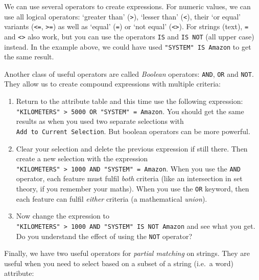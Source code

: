 \documentclass[
  letterpaper,
  DIV=11,
  numbers=noendperiod]{scrreprt}
\begin{document}
We can use several operators to create expressions. For numeric values,
we can use all logical operators: `greater than'
(\texttt{\textgreater{}}), `lesser than' (\texttt{\textless{}}), their
`or equal' variants (\texttt{\textless{}=}, \texttt{\textgreater{}=}) as
well as `equal' (\texttt{=}) or `not equal'
(\texttt{\textless{}\textgreater{}}). For strings (text), \texttt{=} and
\texttt{\textless{}\textgreater{}} also work, but you can use the
operators \texttt{IS} and \texttt{IS\ NOT} (all upper case) instead. In
the example above, we could have used
\texttt{"SYSTEM"\ IS\ \textquotesingle{}Amazon\textquotesingle{}} to get
the same result.

Another class of useful operators are called \emph{Boolean} operators:
\texttt{AND}, \texttt{OR} and \texttt{NOT}. They allow us to create
compound expressions with multiple criteria:

\begin{enumerate}
\def\labelenumi{(\arabic{enumi})}
\setcounter{enumi}{88}
\item
  Return to the attribute table and this time use the following
  expression:
  \texttt{"KILOMETERS"\ \textgreater{}\ 5000\ OR\ "SYSTEM"\ =\ \textquotesingle{}Amazon\textquotesingle{}}.
  You should get the same results as when you used two separate
  selections with \texttt{Add\ to\ Current\ Selection}. But boolean
  operators can be more powerful.
\item
  Clear your selection and delete the previous expression if still
  there. Then create a new selection with the expression
  \texttt{"KILOMETERS"\ \textgreater{}\ 1000\ AND\ "SYSTEM"\ =\ \textquotesingle{}Amazon\textquotesingle{}}.
  When you use the \texttt{AND} operator, each feature must fulfil
  \emph{both} criteria (like an intersection in set theory, if you
  remember your maths). When you use the \texttt{OR} keyword, then each
  feature can fulfil \emph{either} criteria (a mathematical
  \emph{union}).
\item
  Now change the expression to
  \texttt{"KILOMETERS"\ \textgreater{}\ 1000\ AND\ "SYSTEM"\ IS\ NOT\ \textquotesingle{}Amazon\textquotesingle{}}
  and see what you get. Do you understand the effect of using the
  \texttt{NOT} operator?
\end{enumerate}

Finally, we have two useful operators for \emph{partial matching} on
strings. They are useful when you need to select based on a subset of a
string (i.e.~a word) attribute:
\end{document}
